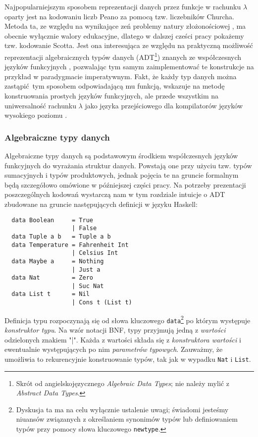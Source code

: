 Najpopularniejszym sposobem reprezentacji danych przez funkcje w rachunku \(\lambda\) oparty jest na kodowaniu liczb Peano za pomocą tzw. liczebników Churcha. Metoda ta, ze względu na wynikające zeń problemy natury złożonościowej \cite{Koopman:2014:CED:2746325.2746330}, ma obecnie wyłącznie walory edukacyjne, dlatego w dalszej cześci pracy pokażemy tzw. kodowanie Scotta. Jest ona interesująca ze względu na praktyczną możliwość reprezentacji algebraicznych typów danych (ADT\footnote{Skrót od angielskojęzycznego \emph{Algebraic Data Types}; nie należy mylić z \emph{Abstract Data Types}.}) znanych ze współczesnych języków funkcyjnych \cite{Jansen:2013:P9C:2941698.2941710}, pozwalając tym samym zaimplementować te konstrukcje na przykład w paradygmacie imperatywnym. Fakt, że każdy typ danych można zastąpić tym sposobem odpowiadającą mu funkcją, wskazuje na metodę konstruowania prostych języków funkcyjnych, ale przede wszystkim na uniwersalność rachunku \(\lambda\) jako języka przejściowego dla kompilatorów języków wysokiego poziomu \cite[Rozdział 3]{PeytonJones:1992:IFL:129390}.

\subsubsection{Algebraiczne typy danych}
Algebraiczne typy danych są podstawowym środkiem współczesnych języków funkcyjnych do wyrażania struktur danych. Powstają one przy użyciu tzw. typów sumacyjnych i typów produktowych, jednak pojęcia te na gruncie formalnym będą szczegółowo omówione w późniejszej części pracy. Na potrzeby prezentacji poszczególnych kodowań wystarczą nam w tym rozdziale intuicje o ADT zbudowane na gruncie następujących definicji w języku Haskell:

\begin{verbatim}
  data Boolean     = True
                   | False
  data Tuple a b   = Tuple a b
  data Temperature = Fahrenheit Int
                   | Celsius Int
  data Maybe a     = Nothing
                   | Just a
  data Nat         = Zero
                   | Suc Nat
  data List t      = Nil
                   | Cons t (List t)
\end{verbatim}
Definicja typu rozpoczynają się od słowa kluczowego \texttt{data}\footnote{Dyskusja ta ma na celu wyłącznie ustalenie uwagi; świadomi jesteśmy niuansów związanych z określaniem synonimów typów lub definiowaniem typów przy pomocy słowa kluczowego \texttt{newtype}.} po którym występuje \emph{konstruktor typu}. Na wzór notacji BNF, typy przyjmują jedną z \emph{wartości} odzielonych znakiem "|". Każda z wartości składa się z \emph{konstruktora wartości} i ewentualnie występujących po nim \emph{parametrów typowych}. Zauważmy, że umożliwia to rekurencyjnie konstruowanie typów, tak jak w wypadku \texttt{Nat} i \texttt{List}.

